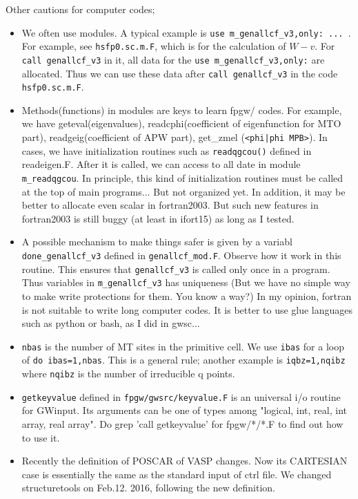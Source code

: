 \documentclass[a4paper,10pt,fleqn]{article}
\newcommand{\io}[1]{{\sf  #1}}
\newcommand{\raw}[1]{{\tt #1}}
\begin{document}
Other cautions for computer codes;
\begin{itemize}
\item 
We often use modules. A typical example is \verb#use m_genallcf_v3,only: ... #. For example, see \raw{hsfp0.sc.m.F}, which is for the calculation of $W-v$.
For \verb#call genallcf_v3# in it, all data for the 
\verb#use m_genallcf_v3,only:# are allocated. Thus we can use these data
after \verb#call genallcf_v3# in the code \raw{hsfp0.sc.m.F}.

\item
Methods(functions) in modules are keys to learn fpgw/ codes.
For example, we have geteval(eigenvalues), 
readcphi(coefficient of eigenfunction for MTO part),
readgeig(coefficient of APW part), get\_zmel (\verb#<phi|phi MPB>#).
In cases, we have initialization routines such as
\raw{readqgcou()} defined in \io{readeigen.F}.
After it is called, we can access to all date in module \verb#m_readqgcou#.
In principle, this kind of initialization routines must be called
at the top of main programs... But not organized yet.
In addition, it may be better to allocate even scalar in fortran2003.
But such new features in fortran2003 is still buggy
(at least in ifort15) as long as I tested.
\item
A possible mechanism to make things safer 
is given by a variabl \verb#done_genallcf_v3# defined in \verb#genallcf_mod.F#.
Observe how it work in this routine.
This ensures that \verb#genallcf_v3# is called only once in a program.
Thus variables in \verb#m_genallcf_v3# has uniqueness
(But we have no simple way to make write protections for them. 
You know a way?)
In my opinion, fortran is not suitable to write long computer codes.
It is better to use glue languages such as python or bash, as I did in gwsc...
\item
\verb#nbas# is the number of MT sites in the primitive cell.
We use \verb#ibas# for a loop of \verb#do ibas=1,nbas#.
This is a general rule; another example is \verb#iqbz=1,nqibz#
where \verb#nqibz# is the number of irreducible q points.
\item
\verb#getkeyvalue# defined in \verb#fpgw/gwsrc/keyvalue.F#
is an universal i/o routine for \io{GWinput}.
Its arguments can be one of types among 
"logical, int, real, int array, real array".
Do grep 'call getkeyvalue' for fpgw/*/*.F 
to find out how to use it.

\item
Recently the definition of POSCAR of VASP changes.
Now its CARTESIAN case is essentially the same as the standard
input of ctrl file. We changed structuretools on Feb.12. 2016, following
the new definition.
\end{itemize}
\end{document}
